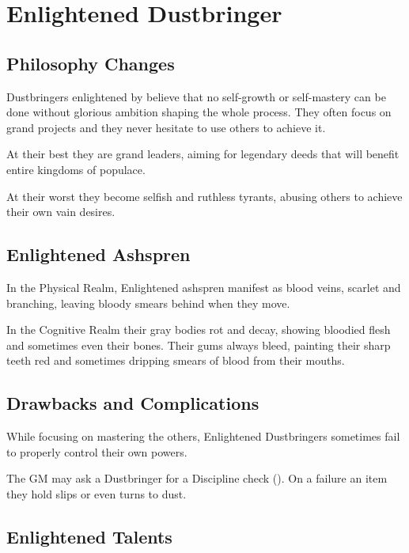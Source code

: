 \newpage
\section{Enlightened Dustbringer}


\subsection{Philosophy Changes}

Dustbringers enlightened by \npcSjaAnat{} believe that no self-growth or self-mastery can be done without glorious ambition shaping the whole process. They often focus on grand projects and they never hesitate to use others to achieve it.

At their best they are grand leaders, aiming for legendary deeds that will benefit entire kingdoms of populace.

At their worst they become selfish and ruthless tyrants, abusing others to achieve their own vain desires.

\subsection{Enlightened Ashspren}

In the Physical Realm, Enlightened ashspren manifest as blood veins, scarlet and branching, leaving bloody smears behind when they move.

In the Cognitive Realm their gray bodies rot and decay, showing bloodied flesh and sometimes even their bones. Their gums always bleed, painting their sharp teeth red and sometimes dripping smears of blood from their mouths. 

\subsection{Drawbacks and Complications}

While focusing on mastering the others, Enlightened Dustbringers sometimes fail to properly control their own powers.

The GM may ask a Dustbringer for a Discipline check (\corruptedResistanceDC{}). On a failure an item they hold slips or even turns to dust.


\subsection{Enlightened Talents}

